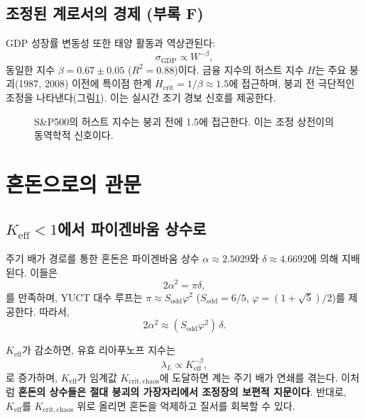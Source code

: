 \documentclass[12pt,a4paper]{article}
\newcommand{\Keff}{K_{\mathrm{eff}}}
\begin{document}
	\subsection{조정된 계로서의 경제 (부록 F)}
	
	GDP 성장률 변동성 또한 태양 활동과 역상관된다:
	\[
	\sigma_{\text{GDP}} \propto W^{-\beta},
	\]
	동일한 지수 \(\beta = 0.67 \pm 0.05\) (\(R^2 = 0.88\))이다. 금융 지수의 허스트 지수 \(H\)는 주요 붕괴(1987, 2008) 이전에 특이점 한계 \(H_{\text{crit}} = 1/\beta \approx 1.5\)에 접근하며, 붕괴 전 극단적인 조정을 나타낸다(그림\ref{fig:hurst}). 이는 실시간 조기 경보 신호를 제공한다.
	
	\begin{figure}[H]
		\centering
		\caption{S\&P500의 허스트 지수는 붕괴 전에 1.5에 접근한다.
			이는 조정 상전이의 동역학적 신호이다.}
		\label{fig:hurst}
	\end{figure}
	
	\section{혼돈으로의 관문}
	
	\subsection{\(\Keff < 1\)에서 파이겐바움 상수로}
	
	주기 배가 경로를 통한 혼돈은 파이겐바움 상수 \(\alpha \approx 2.5029\)와 \(\delta \approx 4.6692\)에 의해 지배된다. 이들은
	\[
	2\alpha^2 = \pi \delta,
	\]
	를 만족하며, YUCT 대수 루프는 \(\pi \approx S_{\mathrm{odd}}\varphi^2\) (\(S_{\mathrm{odd}}=6/5\), \(\varphi = (1+\sqrt{5})/2\))를 제공한다. 따라서,
	\[
	2\alpha^2 \approx (S_{\mathrm{odd}}\varphi^2)\,\delta.
	\]
	
	\(\Keff\)가 감소하면, 유효 리아푸노프 지수는
	\[
	\lambda_L \propto \Keff^{-\beta},
	\]
	로 증가하며, \(\Keff\)가 임계값 \(K_{\mathrm{crit,chaos}}\)에 도달하면 계는 주기 배가 연쇄를 겪는다. 이처럼 \textbf{혼돈의 상수들은 절대 붕괴의 가장자리에서 조정장의 보편적 지문이다}. 반대로, \(\Keff\)를 \(K_{\mathrm{crit,chaos}}\) 위로 올리면 혼돈을 억제하고 질서를 회복할 수 있다.
	
\end{document}
